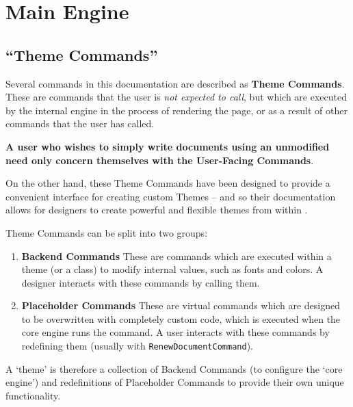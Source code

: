 


\chapter{Main Engine}

	\section{``Theme Commands''}\label{S:ThemeCommands}

		Several commands in this documentation are described as \textbf{Theme Commands}. These are commands that the user is \textit{not expected to call}, but which are executed by the internal engine in the process of rendering the page, or as a result of other commands that the user has called. 

		\begin{center}
		\large \textbf{A user who wishes to simply write documents using an unmodified \rpgtex{} need only concern themselves with the User-Facing Commands}. 
		\end{center}
		On the other hand, these Theme Commands have been designed to provide a convenient interface for creating custom Themes -- and so their documentation allows for designers to create powerful and flexible themes from within \rpgtex{}. 
		
		Theme Commands can be split into two groups:
		
		\begin{enumerate}
			\item \textbf{Backend Commands} These are commands which are executed within a theme (or a class) to modify internal values, such as fonts and colors. A designer interacts with these commands by calling them.
			\item \textbf{Placeholder Commands} These are virtual commands which are designed to be overwritten with completely custom code, which is executed when the core engine runs the command. A user interacts with these commands by redefining them  (usually with \verb|RenewDocumentCommand|).
		\end{enumerate}

		A `theme' is therefore a collection of Backend Commands (to configure the `core engine') and redefinitions of Placeholder Commands to provide their own unique functionality.
		\def\backendCommand{\hyperref[S:ThemeCommands]{\textcolor{blue!40!black}{{Backend Command}}}}
		\def\placeholderCommand{\hyperref[S:ThemeCommands]{\textcolor{blue!40!black}{{Placeholder Command}}}}
